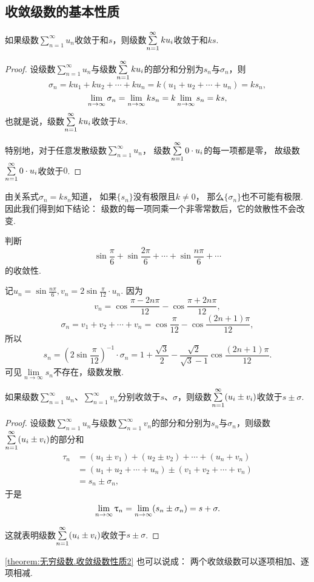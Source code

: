 \subsection{收敛级数的基本性质}
\begin{property}\label{theorem:无穷级数.收敛级数性质1}
如果级数\(\sum\limits_{n=1}^\infty u_n\)收敛于和\(s\)，则级数\(\sum\limits_{n=1}^\infty k u_i\)收敛于和\(ks\).
\begin{proof}
设级数\(\sum\limits_{n=1}^\infty u_n\)与级数\(\sum\limits_{n=1}^\infty k u_i\)的部分和分别为\(s_n\)与\(\sigma_n\)，则\[
	\sigma_n = k u_1 + k u_2 + \dotsb + k u_n = k(u_1 + u_2 + \dotsb + u_n) = k s_n,
\]\[
	\lim\limits_{n\to\infty}\sigma_n = \lim\limits_{n\to\infty} k s_n = k \lim\limits_{n\to\infty} s_n = ks,
\]
也就是说，级数\(\sum\limits_{n=1}^\infty k u_i\)收敛于\(ks\).

特别地，对于任意发散级数\(\sum\limits_{n=1}^\infty u_n\)，
级数\(\sum\limits_{n=1}^\infty 0 \cdot u_i\)的每一项都是零，
故级数\(\sum\limits_{n=1}^\infty 0 \cdot u_i\)收敛于\(0\).
\end{proof}
\end{property}

由关系式\(\sigma_n = k s_n\)知道，
如果\(\{s_n\}\)没有极限且\(k\neq0\)，
那么\(\{\sigma_n\}\)也不可能有极限.
因此我们得到如下结论：
{\color{red}级数的每一项同乘一个非零常数后，它的敛散性不会改变.}

\begin{example}
判断\[
\sin\frac{\pi}{6}+\sin\frac{2\pi}{6}+\dotsb+\sin\frac{n\pi}{6}+\dotsb
\]的收敛性.
\begin{solution}
记\(u_n = \sin\frac{n\pi}{6},
v_n = 2\sin\frac{\pi}{12} \cdot u_n\).
因为\[
v_n = \cos\frac{\pi-2n\pi}{12} - \cos\frac{\pi+2n\pi}{12},
\]\[
\sigma_n
= v_1 + v_2 + \dotsb + v_n
= \cos\frac{\pi}{12} - \cos\frac{(2n+1)\pi}{12},
\]
所以\[
s_n
= \left(2\sin\frac{\pi}{12}\right)^{-1} \cdot \sigma_n
= 1+\frac{\sqrt{3}}{2} - \frac{\sqrt{2}}{\sqrt{3}-1} \cos\frac{(2n+1)\pi}{12}.
\]
可见\(\lim\limits_{n\to\infty} s_n\)不存在，级数发散.
\end{solution}
\end{example}

\begin{property}\label{theorem:无穷级数.收敛级数性质2}
如果级数\(\sum\limits_{n=1}^\infty u_n\)、\(\sum\limits_{n=1}^\infty v_n\)分别收敛于\(s\)、\(\sigma\)，则级数\(\sum\limits_{n=1}^\infty (u_i \pm v_i)\)收敛于\(s \pm \sigma\).
\begin{proof}
设级数\(\sum\limits_{n=1}^\infty u_n\)与级数\(\sum\limits_{n=1}^\infty v_n\)的部分和分别为\(s_n\)与\(\sigma_n\)，则级数\(\sum\limits_{n=1}^\infty (u_i \pm v_i)\)的部分和\[
\begin{split}
\tau_n &= (u_1 \pm v_1) + (u_2 \pm v_2) + \dotsb + (u_n + v_n) \\
&= (u_1 + u_2 + \dotsb + u_n) \pm (v_1 + v_2 + \dotsb + v_n) \\
&= s_n \pm \sigma_n,
\end{split}
\]于是\[
\lim\limits_{n\to\infty} \uptau_n = \lim\limits_{n\to\infty} (s_n \pm \sigma_n) = s + \sigma.
\]

这就表明级数\(\sum\limits_{n=1}^\infty (u_i \pm v_i)\)收敛于\(s \pm \sigma\).
\end{proof}
\end{property}
\cref{theorem:无穷级数.收敛级数性质2} 也可以说成：
{\color{red}两个收敛级数可以逐项相加、逐项相减.}

